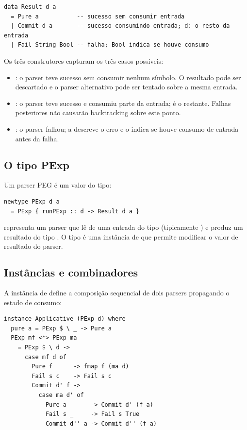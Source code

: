 \begin{verbatim}
data Result d a
  = Pure a           -- sucesso sem consumir entrada
  | Commit d a       -- sucesso consumindo entrada; d: o resto da entrada
  | Fail String Bool -- falha; Bool indica se houve consumo
\end{verbatim}

Os três construtores capturam os três casos possíveis:

\begin{itemize}
  \item{}: o parser teve sucesso sem
    consumir nenhum símbolo. O resultado pode ser descartado e o
    parser alternativo pode ser tentado sobre a mesma entrada.
  \item{}: o parser teve sucesso e
    consumiu parte da entrada;  é o
    restante. Falhas posteriores não causarão backtracking sobre este ponto.
  \item{}: o parser falhou; a
     
    descreve o erro e o 
     indica se houve consumo de entrada
    antes da falha.
\end{itemize}

\subsection{O tipo PExp}

Um parser PEG é um valor do tipo:

\begin{verbatim}
newtype PExp d a
  = PExp { runPExp :: d -> Result d a }
\end{verbatim}

 representa um parser que lê de uma
entrada do tipo  (tipicamente )
e produz um resultado do tipo . O tipo
 é uma instância de  que
permite modificar o valor de resultado do parser.

\subsection{Instâncias e combinadores}

A instância de  define a
composição sequencial de dois parsers propagando o estado de consumo:

\begin{verbatim}
instance Applicative (PExp d) where
  pure a = PExp $ \ _ -> Pure a
  PExp mf <*> PExp ma
    = PExp $ \ d ->
      case mf d of
        Pure f      -> fmap f (ma d)
        Fail s c    -> Fail s c
        Commit d' f ->
          case ma d' of
            Pure a       -> Commit d' (f a)
            Fail s _     -> Fail s True
            Commit d'' a -> Commit d'' (f a)
\end{verbatim}

